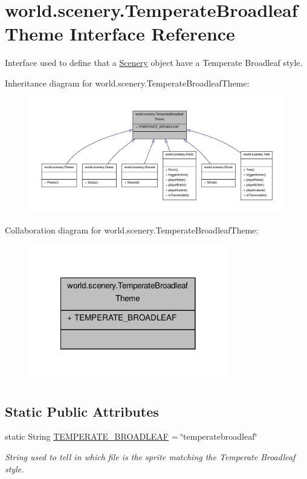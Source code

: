 \hypertarget{a00030}{\section{world.\-scenery.\-Temperate\-Broadleaf\-Theme Interface Reference}
\label{a00030}
}


Interface used to define that a \hyperlink{a00024}{Scenery} object have a Temperate Broadleaf style.  




Inheritance diagram for world.\-scenery.\-Temperate\-Broadleaf\-Theme\-:
\nopagebreak
\begin{figure}[H]
\begin{center}
\leavevmode
\includegraphics[width=350pt]{a00191}
\end{center}
\end{figure}


Collaboration diagram for world.\-scenery.\-Temperate\-Broadleaf\-Theme\-:
\nopagebreak
\begin{figure}[H]
\begin{center}
\leavevmode
\includegraphics[width=246pt]{a00192}
\end{center}
\end{figure}
\subsection*{Static Public Attributes}
\begin{DoxyCompactItemize}
\item 
static String \hyperlink{a00030_a9e9253b684231327dd6ddeca5768033e}{T\-E\-M\-P\-E\-R\-A\-T\-E\-\_\-\-B\-R\-O\-A\-D\-L\-E\-A\-F} = \char`\"{}temperatebroadleaf\char`\"{}
\begin{DoxyCompactList}\small\item\em String used to tell in which file is the sprite matching the Temperate Broadleaf style. \end{DoxyCompactList}\end{DoxyCompactItemize}


